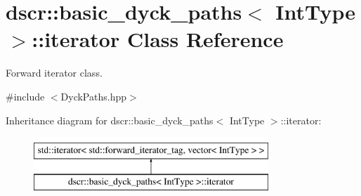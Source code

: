 \hypertarget{classdscr_1_1basic__dyck__paths_1_1iterator}{\section{dscr\-:\-:basic\-\_\-dyck\-\_\-paths$<$ Int\-Type $>$\-:\-:iterator Class Reference}
\label{classdscr_1_1basic__dyck__paths_1_1iterator}
}


Forward iterator class.  




{\ttfamily \#include $<$Dyck\-Paths.\-hpp$>$}

Inheritance diagram for dscr\-:\-:basic\-\_\-dyck\-\_\-paths$<$ Int\-Type $>$\-:\-:iterator\-:\begin{figure}[H]
\begin{center}
\leavevmode
\includegraphics[height=2.000000cm]{classdscr_1_1basic__dyck__paths_1_1iterator}
\end{center}
\end{figure}
